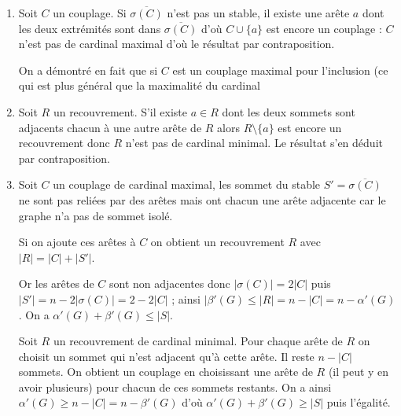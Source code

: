 \begin{Answer}
\begin{enumerate}
\item Soit $C$ un couplage. Si $\overline{\sigma(C)}$ n'est pas un stable, il existe une arête $a$ dont les deux extrémités sont dans $\overline{\sigma(C)}$ d'où $C \cup\{a\}$ est encore un couplage : $C$ n'est pas de cardinal maximal d'où le résultat par contraposition.

On a démontré en fait que si $C$ est un couplage maximal pour l'inclusion (ce qui est plus général que la maximalité du cardinal
\item Soit $R$ un recouvrement. S'il existe $a\in R$ dont les deux sommets sont adjacents chacun à une autre arête de $R$ alors $R\setminus\{a\}$ est encore un recouvrement donc $R$ n'est pas de cardinal minimal. Le résultat s'en déduit par contraposition.
\item Soit $C$ un couplage de cardinal maximal, les sommet du stable $S' = \overline{\sigma(C)}$ ne sont pas reliées par des arêtes mais ont chacun une arête adjacente car le graphe n'a pas de sommet isolé.

Si on ajoute ces arêtes à $C$ on obtient un recouvrement $R$ avec $|R| = |C| + |S'|$.

Or les arêtes de $C$ sont non adjacentes donc $|\sigma(C)| = 2|C|$ puis $|S'| = n - 2|\sigma(C)|
=2 -2|C|$ ; ainsi $|\beta'(G) \le |R| = n - |C| = n - \alpha'(G)$. On a $\alpha'(G)+\beta'(G)\le |S|$.

Soit $R$ un recouvrement de cardinal minimal. Pour chaque arête de $R$ on choisit un sommet qui n'est adjacent qu'à cette arête. Il reste $n - |C|$ sommets. On obtient un couplage en choisissant une arête de $R$ (il peut y en avoir plusieurs) pour chacun de ces sommets restants. On a ainsi
$\alpha'(G) \ge n - |C| = n - \beta'(G)$ d'où $\alpha'(G)+\beta'(G)\ge |S|$ puis l'égalité.
\end{enumerate}
\end{Answer}
